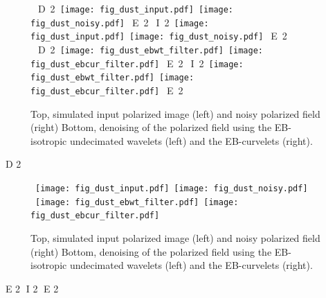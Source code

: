 
\begin{figure*}[htb]
\centerline{
\vbox{
 \hbox{
D 2
 \texttt{[image: fig\_dust\_input.pdf]}
  \texttt{[image: fig\_dust\_noisy.pdf]}
E 2
I 2
 \texttt{[image: fig\_dust\_input.pdf]}
  \texttt{[image: fig\_dust\_noisy.pdf]}
E 2
 }
 \hbox{
D 2
 \texttt{[image: fig\_dust\_ebwt\_filter.pdf]}
  \texttt{[image: fig\_dust\_ebcur\_filter.pdf]}
E 2
I 2
 \texttt{[image: fig\_dust\_ebwt\_filter.pdf]}
  \texttt{[image: fig\_dust\_ebcur\_filter.pdf]}
E 2
 }}}
\caption{Top, simulated input polarized image (left) and noisy polarized field (right) Bottom, denoising of the polarized field using the EB-isotropic undecimated wavelets (left) and the EB-curvelets (right).}
\label{fig_poldust_denoising}
\end{figure*}




D 2

\begin{figure*}[htb]
\centerline{
\vbox{
 \hbox{
 \texttt{[image: fig\_dust\_input.pdf]}
  \texttt{[image: fig\_dust\_noisy.pdf]}
 }
 \hbox{
 \texttt{[image: fig\_dust\_ebwt\_filter.pdf]}
  \texttt{[image: fig\_dust\_ebcur\_filter.pdf]}
 }}}
\caption{Top, simulated input polarized image (left) and noisy polarized field (right) Bottom, denoising of the polarized field using the EB-isotropic undecimated wavelets (left) and the EB-curvelets (right).}
\label{fig_poldust_denoising}
\end{figure*}
E 2
I 2
%
E 2


